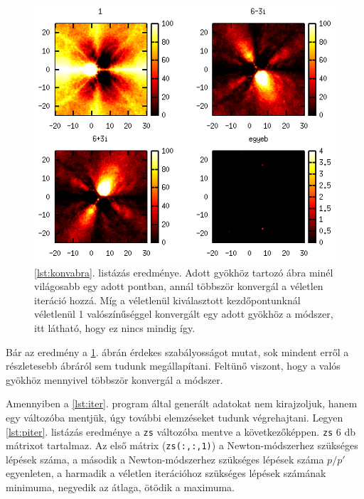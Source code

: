 \documentclass[a4paper,12pt]{report}
\begin{document}
				\begin{figure}[ht]
					\centering
					\includegraphics[scale=0.65]{kepek/Konv2.png}
					\caption{\ref{lst:konvabra}. listázás eredménye. Adott gyökhöz tartozó ábra minél világosabb egy adott pontban, annál többször konvergál a véletlen iteráció hozzá. Míg a véletlenül kiválasztott kezdőpontunknál véletlenül 1 valószínűséggel konvergált egy adott gyökhöz a módszer, itt látható, hogy ez nincs mindig így.} \label{fig:konv_el}
				\end{figure}

				Bár az eredmény a \ref{fig:konv_el}. ábrán érdekes szabályosságot mutat, sok mindent erről a részletesebb ábráról sem tudunk megállapítani. Feltünő viszont, hogy a valós gyökhöz mennyivel többször konvergál a módszer.

				Amennyiben a \ref{lst:iter}. program által generált adatokat nem kirajzoljuk, hanem egy változóba mentjük, úgy további elemzéseket tudunk végrehajtani. Legyen \ref{lst:piter}. listázás  eredménye a \texttt{zs} változóba mentve a következőképpen. \texttt{zs} 6 db mátrixot tartalmaz. Az első mátrix (\texttt{zs(:,:,1)}) a Newton-módszerhez szükséges lépések száma, a második a Newton-módszerhez szükséges lépések száma $p/p'$ egyenleten, a harmadik a véletlen iterációhoz szükséges lépések számának minimuma, negyedik az átlaga, ötödik a maximuma.
\end{document}
